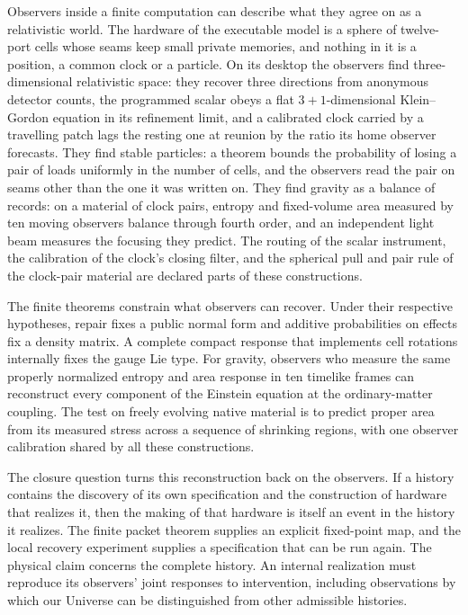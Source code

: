 \documentclass[11pt]{article}
\theoremstyle{definition}
\theoremstyle{remark}
\begin{document}
Observers inside a finite computation can describe what they agree on
as a relativistic world. The hardware of the executable model is a
sphere of twelve-port cells whose seams keep small private memories, and
nothing in it is a position, a common clock or a particle. On its desktop
the observers find three-dimensional relativistic space: they recover
three directions from anonymous detector counts, the programmed scalar
obeys a flat $3{+}1$-dimensional Klein--Gordon equation in its refinement
limit, and a calibrated clock carried by a travelling patch lags the
resting one at reunion by the ratio its home observer forecasts. They
find stable particles: a theorem bounds the probability of losing a pair
of loads uniformly in the number of cells, and the observers read the
pair on seams other than the one it was written on. They find gravity as
a balance of records: on a material of clock pairs, entropy and
fixed-volume area measured by ten moving observers balance through fourth
order, and an independent light beam measures the focusing they predict.
The routing of the scalar instrument, the calibration of the clock's
closing filter, and the spherical pull and pair rule of the clock-pair
material are declared parts of these constructions.

The finite theorems constrain what observers can recover. Under their
respective hypotheses, repair fixes a public normal form and additive
probabilities on effects fix a density matrix. A complete compact response
that implements cell rotations internally fixes the gauge Lie type.
For gravity, observers who measure the same properly normalized entropy
and area response in ten timelike frames can reconstruct every component
of the Einstein equation at the ordinary-matter coupling. The test on
freely evolving native material is to predict proper area from its
measured stress across a sequence of shrinking regions, with one observer
calibration shared by all these constructions.

The closure question turns this reconstruction back on the observers.
If a history contains the discovery of its own specification and the
construction of hardware that realizes it, then the making of that
hardware is itself an event in the history it realizes. The finite
packet theorem supplies an explicit fixed-point map, and the local
recovery experiment supplies a specification that can be run again.
The physical claim concerns the complete history. An internal
realization must reproduce its observers' joint responses to
intervention, including observations by which our Universe can be
distinguished from other admissible histories.
\end{document}
